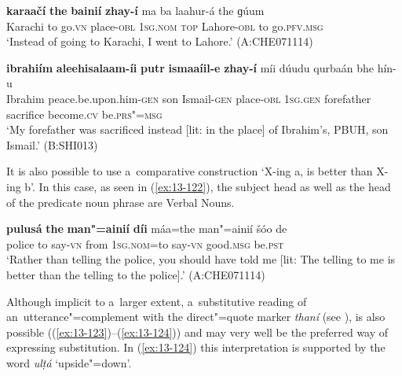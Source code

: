 \begin{exe}
\ex
\label{ex:13-120}
\gll \textbf{karaačí} \textbf{the} \textbf{bainií} \textbf{zhay-í} ma ba laahur-á  the ɡúum \\
Karachi to go.\textsc{vn} place-\textsc{obl} \textsc{1sg.nom} \textsc{top} Lahore-\textsc{obl} to go.\textsc{pfv.msg} \\
\glt `Instead of going to Karachi, I went to Lahore.' (A:CHE071114)

\ex
\label{ex:13-121}
\gll \textbf{ibrahiím} \textbf{aleehisalaam-íi} \textbf{putr} \textbf{ismaaíil-e} \textbf{zhay-í} míi dúudu qurbaán bhe hín-u \\
Ibrahim peace.be.upon.him-\textsc{gen} son Ismail-\textsc{gen} place-\textsc{obl}  \textsc{1sg.gen} forefather sacrifice become.\textsc{cv} be.\textsc{prs"=msg} \\
\glt `My forefather was sacrificed instead [lit: in the place] of Ibrahim's, PBUH, son Ismail.' (B:SHI013) 
\end{exe}

It is also possible to use a~comparative construction `X-ing a, is better than X-ing b'. In this case, as seen in (\ref{ex:13-122}), the subject head as well as the head of the predicate noun phrase are Verbal Nouns.

\begin{exe}
\ex
\label{ex:13-122}
\gll \textbf{pulusá} \textbf{the} \textbf{man"=ainií} \textbf{díi} máa=the man"=ainií šóo de \\
police to say-\textsc{vn} from \textsc{1sg.nom=}to say-\textsc{vn} good.\textsc{msg} be.\textsc{pst} \\
\glt `Rather than telling the police, you should have told me [lit: The telling to me is better than the telling to the police].' (A:CHE071114) 
\end{exe}

Although implicit to a~larger extent, a~substitutive reading of an~utterance"=complement with the direct"=quote marker \textit{thaní} (see ), is also possible ((\ref{ex:13-123})--(\ref{ex:13-124})) and may very well be the preferred way of expressing substitution. In (\ref{ex:13-124}) this interpretation is supported by the word \textit{ulṭá} `upside"=down'.

